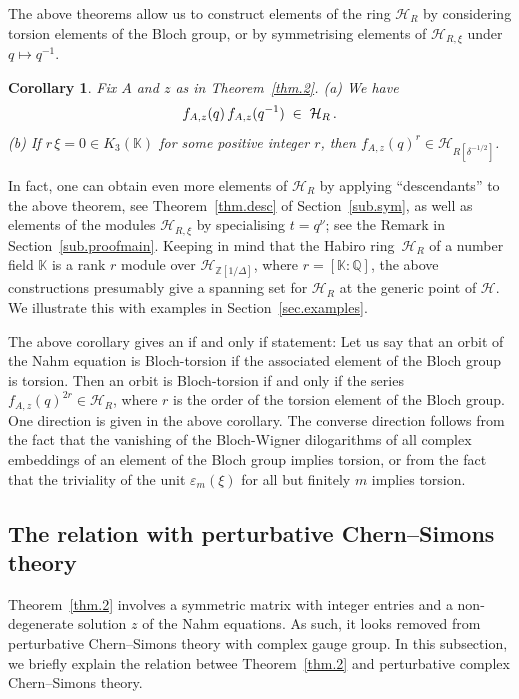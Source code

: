 \documentclass[12pt,reqno]{amsart}
\newtheorem{corollary}[proposition]{Corollary}
\theoremstyle{definition}
\def\BZ{\mathbb Z}
\def\BQ{\mathbb Q}
\def\BK{\mathbb K}
\def\calH{\mathcal H}
\def\ve{\varepsilon}
\def\be{\begin{equation}}
\def\ee{\end{equation}}
\def\inn{\;\in\;}
\def\Phitof{f}
\begin{document}
The above theorems allow us to construct elements of the ring $\calH_R$ by
considering torsion elements of the Bloch group, or by symmetrising elements of
$\calH_{R,\xi}$ under $q\mapsto q^{-1}$.

\begin{corollary}
\label{cor.3}
Fix $A$ and $z$ as in Theorem~\ref{thm.2}.
\newline
\emph{(}a\emph{)} We have
\be
\label{symhab}
\Phitof_{A,z}(q)\thinspace \Phitof_{A,z}(q^{-1}) \inn \calH_{R} \,.
\ee
\emph{(}b\emph{)} If $r \, \xi =0 \in K_3(\BK)$ for some positive integer $r$, then
$\Phitof_{A,z}(q)^{r} \in \calH_{R[\delta^{-1/2}]}$.
\end{corollary}

In fact, one can obtain even more elements of $\calH_R$ by applying ``descendants''
to the above theorem, see Theorem~\ref{thm.desc} of Section~\ref{sub.sym}, as well
as elements of the modules $\calH_{R,\xi}$ by specialising $t=q^\nu$; see the Remark
in Section~\ref{sub.proofmain}.
Keeping in mind that the Habiro ring~$\calH_R$ of a number field $\BK$ is a rank
$r$ module over $\calH_{\BZ[1/\Delta]}$, where $r=[\BK:\BQ]$, the above constructions
presumably give a spanning set for $\calH_R$ at the generic point of $\calH$.
We illustrate this with examples in Section~\ref{sec.examples}.

The above corollary gives an if and only if statement: Let us say that an orbit of
the Nahm equation is Bloch-torsion if the associated element of the Bloch group
is torsion. Then an orbit is Bloch-torsion if and only if the series
$\Phitof_{A,z}(q)^{2r} \in \calH_{R}$, where $r$ is the order of the torsion element
of the Bloch group. One direction is given in the above corollary. The converse
direction follows from the fact that the vanishing of the Bloch-Wigner dilogarithms
of all complex embeddings of an element of the Bloch group implies torsion, or from
the fact that the triviality of the unit $\ve_m(\xi)$ for all but finitely $m$
implies torsion.

\subsection{The relation with perturbative Chern--Simons theory}
\label{sub.CS}

Theorem~\ref{thm.2} involves a symmetric matrix with integer entries and a
non-degenerate solution $z$ of the Nahm equations. As such, it looks removed from
perturbative Chern--Simons theory with complex gauge group.
In this subsection, we briefly explain the relation betwee Theorem~\ref{thm.2} and
perturbative complex Chern--Simons theory.
\end{document}
